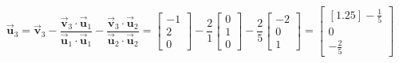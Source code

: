 \documentclass[letter,11pt]{article}
\theoremstyle{definition}
\newcommand{\vvec}{\vec{\boldsymbol{v}}}
\newcommand{\uvec}{\vec{\boldsymbol{u}}}
\begin{document}
\begin{tcolorbox}[boxrule=1mm,enhanced jigsaw, breakable,before=\hfill,after=\hfill,adjusted title={Problem 4 solutions}]
\begin{enumerate}[label = \alph*.)]
             $$\uvec_{3} = \vvec_{3}-\frac{\vvec_{3} \cdot \uvec_{1}}{\uvec_{1} \cdot \uvec_{1}} - \frac{\vvec_{3} \cdot \uvec_{2}}{\uvec_{2} \cdot \uvec_{2}} = \begin{bmatrix}-1\\ 2\\ 0 \end{bmatrix} - \frac{2}{1}\begin{bmatrix}0\\ 1\\ 0 \end{bmatrix} - \frac{2}{5} \begin{bmatrix}-2\\ 0\\ 1 \end{bmatrix}= \begin{bmatrix}[1.25]-\frac{1}{5}\\ 0\\ -\frac{2}{5} \end{bmatrix}$$
             

\end{enumerate}
\end{tcolorbox}
\end{document}
